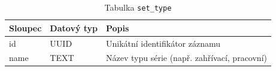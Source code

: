 \begin{table}[ht!]
    \centering
    \begin{tabularx}{\textwidth}{|l|l|L|}
        \hline
        \textbf{Sloupec} & \textbf{Datový typ} & \textbf{Popis}                               \\ \hline
        id               & UUID                & Unikátní identifikátor záznamu               \\ \hline
        name             & TEXT                & Název typu série (např. zahřívací, pracovní) \\ \hline
    \end{tabularx}
    \caption{Tabulka \texttt{set\_type}}
    \label{tab:set_type}
\end{table}
